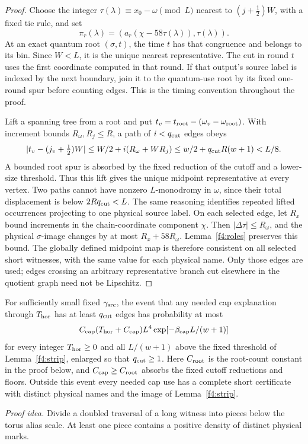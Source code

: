 \begin{proof}
Choose the integer \(\tau(\lambda)\equiv x_0-\omega\pmod L\) nearest to
\((j+\tfrac12)W\), with a fixed tie rule, and set
\[
 \pi_r(\lambda)=
   (a_r(\chi-58\tau(\lambda)),\tau(\lambda)).
\]
At an exact quantum root \((\sigma,t)\), the time \(t\) has that
congruence and belongs to its bin. Since \(W<L\), it is the unique
nearest representative. The cut in round \(t\) uses the first coordinate computed in that
round. If that output's source label is indexed by the next boundary, join it
to the quantum-use root by its fixed one-round spur before counting
edges. This is the timing convention throughout the proof.

Lift a spanning tree from a root and put
\(t_v=t_{\rm root}-(\omega_v-\omega_{\rm root})\). With increment bounds
\(R_\omega,R_j\le R\), a path of \(i<q_{\rm cut}\) edges obeys
\[
 |t_v-(j_v+\tfrac12)W|
 \le W/2+i(R_\omega+WR_j)
 \le w/2+q_{\rm cut}R(w+1)<L/8.
\]
A bounded root spur is absorbed by the fixed reduction of the cutoff
and a lower-size threshold. Thus this lift gives the unique midpoint
representative at every vertex. Two paths cannot have nonzero
\(L\)-monodromy in \(\omega\), since their total displacement is below
\(2Rq_{\rm cut}<L\). The same reasoning identifies repeated lifted
occurrences projecting to one physical source label. On each selected edge, let \(R_x\) bound increments in the chain-coordinate component \(\chi\). Then
\(|\Delta\tau|\le R_\omega\), and the physical \(\sigma\)-image changes
by at most \(R_x+58R_\omega\). Lemma~\ref{f4:roles} preserves this bound.
The globally defined midpoint map is therefore consistent on all
selected short witnesses, with the same value for each physical name.
Only those edges are used; edges crossing an arbitrary representative
branch cut elsewhere in the quotient graph need not be Lipschitz.
\end{proof}

\begin{lemma}\label{f4:cap-exception}
For sufficiently small fixed \(\gamma_{\rm src}\), the event that any needed
cap explanation through \(T_{\rm hor}\) has at least \(q_{\rm cut}\) edges
has probability at most
\[
 C_{\rm cap}(T_{\rm hor}+C_{\rm cap})L^4
           \exp[-\beta_{\rm cap} L/(w+1)]
\]
for every integer \(T_{\rm hor}\ge0\) and all \(L/(w+1)\) above the
fixed threshold of Lemma~\ref{f4:strip}, enlarged so that
\(q_{\rm cut}\ge1\). Here \(C_{\rm root}\) is the root-count constant
in the proof below, and \(C_{\rm cap}\ge C_{\rm root}\) absorbs the
fixed cutoff reductions and floors.
Outside this event every needed cap use has a complete short certificate
with distinct physical names and the image of Lemma~\ref{f4:strip}.
\end{lemma}
\par\noindent\emph{Proof idea.} Divide a doubled traversal of a long witness into pieces below the torus alias scale. At least one piece contains a positive density of distinct physical marks.

